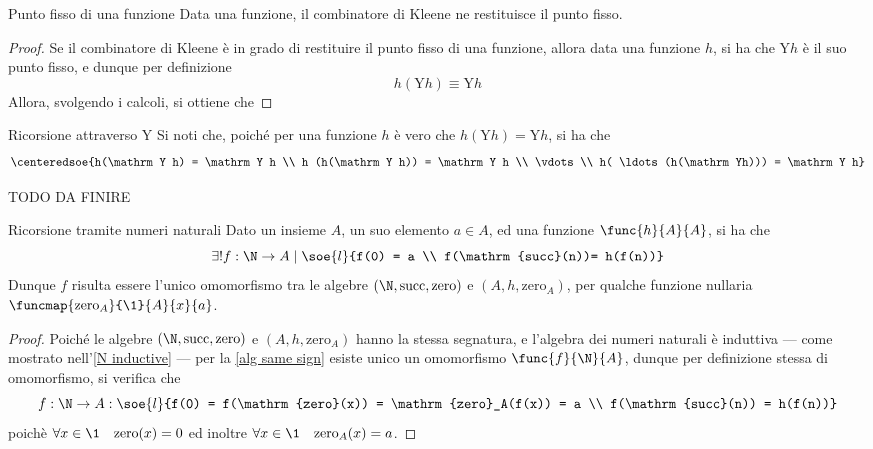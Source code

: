 \documentclass[a4paper, 12pt]{report}
\begin{document}
    \begin{framedprop}{Punto fisso di una funzione}
        Data una funzione, il combinatore di Kleene ne restituisce il punto fisso.
    \end{framedprop}

    \begin{proof}
        Se il combinatore di Kleene è in grado di restituire il punto fisso di una funzione, allora data una funzione $h$, si ha che $\mathrm Yh$ è il suo punto fisso, e dunque per definizione $$h(\mathrm Yh) \equiv \mathrm Yh$$ Allora, svolgendo i calcoli, si ottiene che 
    \end{proof}

    \begin{framedobs}{Ricorsione attraverso $\mathrm Y$}
        Si noti che, poiché per una funzione $h$ è vero che $h(\mathrm Yh) = \mathrm Y h$, si ha che $$\centeredsoe{h(\mathrm Y h) = \mathrm Y h \\ h (h(\mathrm Y h)) = \mathrm Y h \\ \vdots \\ h( \ldots (h(\mathrm Yh))) = \mathrm Y h}$$

        TODO DA FINIRE
    \end{framedobs}

    \begin{framedlem}[label={weak term ric}]{Ricorsione tramite numeri naturali}
        Dato un insieme $A$, un suo elemento $a \in A$, ed una funzione $\func{h}{A}{A}$, si ha che $$\exists ! f: \N \to A \mid \soe{l}{f(0) = a \\ f(\mathrm{succ}(n))= h(f(n))}$$ Dunque $f$ risulta essere l'unico omomorfismo tra le algebre $(\N, \mathrm{succ}, \mathrm{zero})$ e $(A, h, \mathrm{zero}_A)$, per qualche funzione nullaria $\funcmap{\mathrm{zero}_A}{\1}{A}{x}{a}$.
    \end{framedlem}

    \begin{proof}
        Poiché le algebre $(\N, \mathrm{succ}, \mathrm{zero})$ e $(A, h, \mathrm{zero}_A)$ hanno la stessa segnatura, e l'algebra dei numeri naturali è induttiva --- come mostrato nell'\cref{N inductive} --- per la \cref{alg same sign} esiste unico un omomorfismo $\func{f}{\N}{A}$, dunque per definizione stessa di omomorfismo, si verifica che $$f:\N \to A :\soe{l}{f(0) = f(\mathrm{zero}(x)) = \mathrm{zero}_A(f(x)) = a \\ f(\mathrm{succ}(n)) = h(f(n))}$$ poichè $\forall x \in \1 \quad \mathrm{zero}(x) = 0$ ed inoltre $\forall x \in \1 \quad \mathrm{zero}_A(x) = a$.
    \end{proof}
\end{document}
